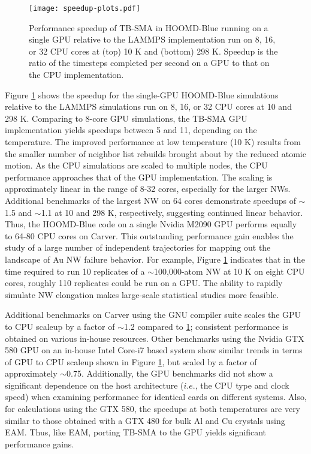 \documentclass[10pt]{report}  %
\begin{document}
\begin{figure}[t!]
	\centering
	\texttt{[image: speedup-plots.pdf]}
	\caption{Performance speedup of TB-SMA in HOOMD-Blue running on a single GPU relative to the LAMMPS implementation run on 8, 16, or 32 CPU cores at (top) 10 K and (bottom) 298 K. Speedup is the ratio of the timesteps completed per second on a GPU to that on the CPU implementation.  }
	\label{fig:speedup}
\end{figure}

Figure \ref{fig:speedup} shows the speedup for the single-GPU HOOMD-Blue simulations relative to the LAMMPS simulations run on 8, 16, or 32 CPU cores at 10 and 298 K. Comparing to 8-core GPU simulations, the TB-SMA GPU implementation yields speedups between 5 and 11, depending on the temperature. The improved performance at low temperature (10 K) results from the smaller number of neighbor list rebuilds brought about by the reduced atomic motion. As the CPU simulations are scaled to multiple nodes, the CPU performance approaches that of the GPU implementation. The scaling is approximately linear in the range of 8-32 cores, especially for the larger NWs. Additional benchmarks of the largest NW on 64 cores demonstrate speedups of $\sim$1.5 and $\sim$1.1 at 10 and 298 K, respectively, suggesting continued linear behavior. Thus, the HOOMD-Blue code on a single Nvidia M2090 GPU performs equally to 64-80 CPU cores on Carver.  This outstanding performance gain enables the study of a large number of independent trajectories for mapping out the landscape of Au NW failure behavior. For example, Figure \ref{fig:speedup} indicates that in the time required to run 10 replicates of a $\sim$100,000-atom NW at 10 K on eight CPU cores, roughly 110 replicates could be run on a GPU. The ability to rapidly simulate NW elongation makes large-scale statistical studies more feasible.  

Additional benchmarks on Carver using the GNU compiler suite scales the GPU to CPU scaleup by a factor of $\sim$1.2 compared to \ref{fig:speedup}; consistent performance is obtained on various in-house resources. Other benchmarks using the Nvidia GTX 580 GPU on an in-house Intel Core-i7 based system show similar trends in terms of GPU to CPU scaleup shown in Figure \ref{fig:speedup}, but scaled by a factor of approximately $\sim$0.75.  Additionally, the GPU benchmarks did not show a significant dependence on the host architecture ($i.e.$, the CPU type and clock speed) when examining performance for identical cards on different systems.  Also, for calculations using the GTX 580, the speedups at both temperatures are very similar to those obtained with a GTX 480 for bulk Al and Cu crystals using EAM. \cite{Morozov:2011} Thus, like EAM, porting TB-SMA to the GPU yields significant performance gains.   
\end{document}
